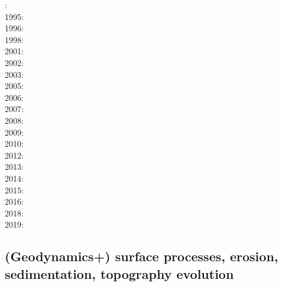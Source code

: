:\cite{yusa84}\\
1995:\cite{budi95}\\
1996:\cite{hach96}\\
1998:\cite{copo98}\\
2001:\cite{vapy01}\\
2002:\cite{mumh02}\cite{modm02}\\
2003:\cite{hukm03}\cite{wabu03}\\
2005:\cite{mure05}\\
2006:\cite{kapo06}\cite{mudm06}\\
2007:\cite{kabe07}\\
2008:\cite{baso08}\cite{fukk08}\\
2009:\cite{qurj09}\\
2010:\cite{bepo10}\\
2012:\cite{gerb12}\cite{kasc12}\\
2013:\cite{wahd13}\\
2014:\cite{famc14}\cite{fogm14}\\
2015:\cite{thkp15}\\
2016:\cite{bafl16}\cite{jads16}\cite{olbm16}\cite{bafl16}\\
2018:\cite{dusd18}\\
2019:\cite{pact19}

\subsection*{(Geodynamics+) surface processes, erosion, sedimentation, topography evolution}
 

